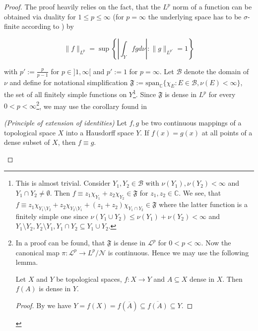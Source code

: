 \begin{proof}
	The proof heavily relies on the fact, that the $L^p$ norm of a function can be obtained via duality for $1 \leqslant p \leqslant \infty$ (for $p = \infty$ the underlying space has to be $\sigma$-finite according to \cite[288--289]{elstrodt:mass:2011}) by 
	
	\begin{equation*}
		\|f\|_{L^p} = \sup \left\{ \left\vert \int_Y fgd\nu\right\vert : \|g\|_{L^{p'}} = 1\right\}
	\end{equation*}

with $p' := \frac{p}{p - 1}$ for $p \in ]1,\infty[$ and $p' := 1$ for $p = \infty$. Let $\mathcal{B}$ denote the domain of $\nu$ and define for notational simplification $\mathfrak{F} := \mathrm{span}_{\mathbb{C}}\{\chi_E: E \in \mathcal{B},\nu(E) < \infty\}$, the set of all finitely simple functions on $Y$\footnote{
		This is almost trivial. Consider $Y_1,Y_2 \in \mathcal{B}$ with $\nu(Y_1),\nu(Y_2) < \infty$ and $Y_1 \cap Y_2 \neq \emptyset$. Then $f \equiv z_1\chi_{Y_1} + z_2\chi_{Y_2} \in \mathfrak{F}$ for $z_1,z_2 \in \mathbb{C}$. We see, that $f \equiv z_1 \chi_{Y_1\setminus Y_2} + z_2 \chi_{Y_2\setminus Y_1} + (z_1 + z_2)\chi_{Y_1 \cap Y_2} \in \mathfrak{F}$ where the latter function is a finitely simple one since $\nu(Y_1 \cup Y_2) \leqslant \nu(Y_1) + \nu(Y_2) < \infty$ and $Y_1\setminus Y_2,Y_2 \setminus Y_1, Y_1 \cap Y_2 \subseteq Y_1 \cup Y_2$.	
	}. Since $\mathfrak{F}$ is dense in $L^p$ for every $0 < p < \infty$\footnote{
		In \cite[242]{elstrodt:mass:2011} a proof can be found, that $\mathfrak{F}$ is dense in $\mathcal{L}^p$ for $0< p < \infty$. Now the canonical map $\pi: \mathcal{L}^p \rightarrow L^p/\mathcal{N}$ is continuous. Hence we may use the following lemma.

		\begin{lemma}
			Let $X$ and $Y$ be topological spaces, $f: X \rightarrow Y$ and $A \subseteq X$ dense in $X$. Then $f(A)$ is dense in $Y$. 
		\end{lemma}

		\begin{proof}
			By \cite[104]{munkres:topology:2000} we have $Y = f(X) = f(\overline{A})  \subseteq \overline{f(A)} \subseteq Y$.
		\end{proof}
		
		
	}, we may use the corollary found in \cite[76]{bourbaki:general_topology:1995}
	
	\begin{corollary}\emph{(Principle of extension of identities)}
		Let $f,g$ be two continuous mappings of a topological space $X$ into a Hausdorff space $Y$. If $f(x) = g(x)$ at all points of a dense subset of $X$, then $f \equiv g$.
	\end{corollary}


\end{proof}
